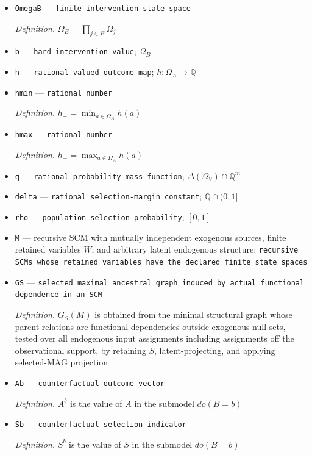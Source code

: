 \documentclass{article}
\begin{document}
\begin{itemize}
  \item \texttt{OmegaB} --- \texttt{finite intervention state space}
  \par\smallskip\noindent\emph{Definition.} \(\Omega_B=\prod_{j\in B}\Omega_j\)
  \item \texttt{b} --- \texttt{hard-\allowbreak{}intervention value}; \(\Omega_B\)
  \item \texttt{h} --- \texttt{rational-\allowbreak{}valued outcome map}; \(h:\Omega_A\to\mathbb Q\)
  \item \texttt{hmin} --- \texttt{rational number}
  \par\smallskip\noindent\emph{Definition.} \(h_-=\min_{a\in\Omega_A}h(a)\)
  \item \texttt{hmax} --- \texttt{rational number}
  \par\smallskip\noindent\emph{Definition.} \(h_+=\max_{a\in\Omega_A}h(a)\)
  \item \texttt{q} --- \texttt{rational probability mass function}; \(\Delta(\Omega_V)\cap\mathbb Q^m\)
  \item \texttt{delta} --- \texttt{rational selection-\allowbreak{}margin constant}; \(\mathbb Q\cap(0,1]\)
  \item \texttt{rho} --- \texttt{population selection probability}; \([0,1]\)
  \item \texttt{M} --- recursive SCM with mutually independent exogenous sources, finite retained variables \(W\), and arbitrary latent endogenous structure; \texttt{recursive SCMs whose retained variables have the declared finite state spaces}
  \item \texttt{GS} --- \texttt{selected maximal ancestral graph induced by actual functional dependence in an SCM}
  \par\smallskip\noindent\emph{Definition.} \(G_S(M)\) is obtained from the minimal structural graph whose parent relations are functional dependencies outside exogenous null sets, tested over all endogenous input assignments including assignments off the observational support, by retaining \(S\), latent-projecting, and applying selected-MAG projection
  \item \texttt{Ab} --- \texttt{counterfactual outcome vector}
  \par\smallskip\noindent\emph{Definition.} \(A^b\) is the value of \(A\) in the submodel \(do(B=b)\)
  \item \texttt{Sb} --- \texttt{counterfactual selection indicator}
  \par\smallskip\noindent\emph{Definition.} \(S^b\) is the value of \(S\) in the submodel \(do(B=b)\)

\end{itemize}
\end{document}
